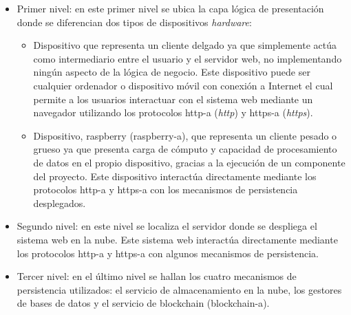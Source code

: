 \documentclass[12pt,a4paper, twoside]{report}
\begin{document}
	\begin{itemize}
		\item Primer nivel: en este primer nivel se ubica la capa lógica de presentación donde se diferencian dos tipos de dispositivos \textit{hardware}:
			\begin{itemize}
				\item Dispositivo que representa un cliente delgado ya que simplemente actúa como intermediario entre el usuario y el servidor web, no implementando ningún aspecto de la lógica de negocio. Este dispositivo puede ser cualquier ordenador o dispositivo móvil con conexión a Internet el cual permite a los usuarios interactuar con el sistema web mediante un navegador utilizando los protocolos \gls{http-a} (\textit{\gls{http}}) y \gls{https-a} (\textit{\gls{https}}). %
				\item Dispositivo, \gls{raspberry} (\gls{raspberry-a}), que representa un cliente pesado o grueso ya que presenta carga de cómputo y capacidad de procesamiento de datos en el propio dispositivo, gracias a la ejecución de un componente del proyecto. Este dispositivo interactúa directamente mediante los protocolos \gls{http-a} y \gls{https-a} con los mecanismos de persistencia desplegados. %
			\end{itemize}
				 		
		\item Segundo nivel: en este nivel se localiza el servidor donde se despliega el sistema web en la nube. Este sistema web interactúa directamente mediante los protocolos \gls{http-a} y \gls{https-a} con algunos mecanismos de persistencia.
		
		\item Tercer nivel: en el último nivel se hallan los cuatro mecanismos de persistencia utilizados: el servicio de almacenamiento en la nube, los gestores de bases de datos y el servicio de \Gls{blockchain} (\gls{blockchain-a}).
	\end{itemize}
	  
\end{document}
